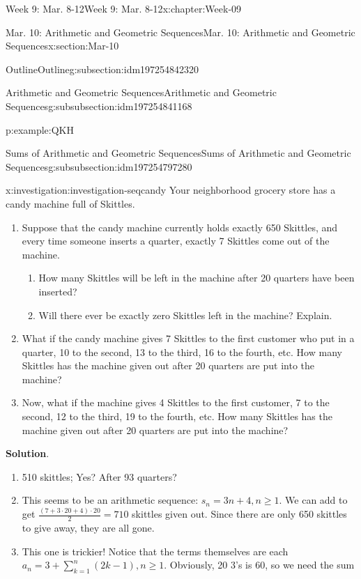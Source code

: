 \documentclass[oneside,10pt,]{book}
\newcommand{\blocktitlefont}{\relax}
\numberwithin{equation}{section}
\renewcommand{\ge}{\geqslant}
\begin{document}
\begin{chapterptx}{Week 9: Mar. 8-12}{}{Week 9: Mar. 8-12}{}{}{x:chapter:Week-09}
\begin{sectionptx}{Mar. 10: Arithmetic and Geometric Sequences}{}{Mar. 10: Arithmetic and Geometric Sequences}{}{}{x:section:Mar-10}
\begin{subsectionptx}{Outline}{}{Outline}{}{}{g:subsection:idm197254842320}
\begin{subsubsectionptx}{Arithmetic and Geometric Sequences}{}{Arithmetic and Geometric Sequences}{}{}{g:subsubsection:idm197254841168}
\begin{example}{}{p:example:QKH}
\begin{enumerate}
\end{enumerate}
%
\end{example}
\end{subsubsectionptx}
%
%
\typeout{************************************************}
\typeout{************************************************}
%
\begin{subsubsectionptx}{Sums of Arithmetic and Geometric Sequences}{}{Sums of Arithmetic and Geometric Sequences}{}{}{g:subsubsection:idm197254797280}
\begin{investigation}{}{x:investigation:investigation-seqcandy}%
Your neighborhood grocery store has a candy machine full of Skittles.%
\begin{enumerate}
\item{}Suppose that the candy machine currently holds exactly 650 Skittles, and every time someone inserts a quarter, exactly 7 Skittles come out of the machine.%
\begin{enumerate}
\item{}How many Skittles will be left in the machine after 20 quarters have been inserted?%
\item{}Will there ever be exactly zero Skittles left in the machine? Explain.%
\end{enumerate}
%
\item{}What if the candy machine gives 7 Skittles to the first customer who put in a quarter, 10 to the second, 13 to the third, 16 to the fourth, etc. How many Skittles has the machine given out after 20 quarters are put into the machine?%
\item{}Now, what if the machine gives 4 Skittles to the first customer, 7 to the second, 12 to the third, 19 to the fourth, etc. How many Skittles has the machine given out after 20 quarters are put into the machine?%
\end{enumerate}
%
\par\smallskip%
\noindent\textbf{\blocktitlefont Solution}.\hypertarget{g:solution:idm197254787680}{}\quad{}%
\begin{enumerate}
\item{}510 skittles; Yes? After 93 quarters?%
\item{}This seems to be an arithmetic sequence: \(s_n = 3n+4, n \ge 1\). We can add to get \(\frac{(7+3\cdot 20+4)\cdot 20}{2} = 710\) skittles given out. Since there are only 650 skittles to give away, they are all gone.%
\item{}This one is trickier! Notice that the terms themselves are each \(a_n  = 3 + \sum_{k=1}^n (2k-1), n\ge 1\). Obviously, 20 3's is 60, so we need the sum%

\end{enumerate}
\end{investigation}
\end{subsubsectionptx}
\end{subsectionptx}
\end{sectionptx}
\end{chapterptx}
\end{document}
